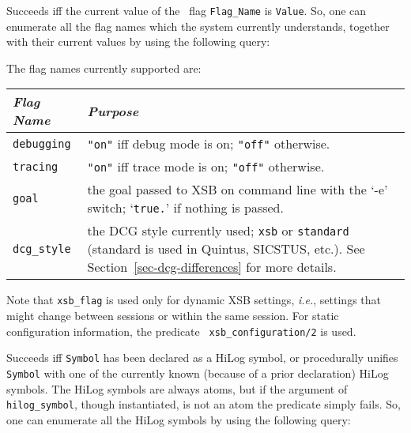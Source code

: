 \begin{description}
    Succeeds iff the current value of the \ourprolog\ flag {\tt Flag\_Name} is 
    {\tt Value}. So, one can enumerate all the flag names which the system
    currently understands, together with their current values by using the
    following query:


    The flag names currently supported are:

    \begin{center}
    \begin{tabular}{||l|p{11cm}||}               \hline
	{\em Flag Name}		& {\em Purpose} \\ \hline \hline
	{\tt debugging}		& 
		{\tt "on"} iff debug mode is on; {\tt "off"} otherwise.\\ \hline
	{\tt tracing}		& 
		{\tt "on"} iff trace mode is on; {\tt "off"} otherwise.\\ \hline
	{\tt goal}		& 
		the goal passed to XSB on command line with the `-e'
                switch; `{\tt true.}' if nothing is passed.
                \\ \hline
        {\tt dcg\_style}        &
                the DCG style currently used; {\tt xsb} or {\tt standard}
                (standard is used in Quintus, SICSTUS, etc.).
                See Section~\ref{sec-dcg-differences} for more details.
                \\ \hline
    \end{tabular}
    \end{center}
    
    Note that {\tt xsb\_flag} is used only for dynamic XSB settings, {\it
      i.e.}, settings that might change between sessions or within the same
    session. For static configuration information, the predicate {\tt
      xsb\_configuration/2} is used.  

    Succeeds iff {\tt Symbol} has been declared as a HiLog symbol, or 
    procedurally unifies {\tt Symbol} with one of the currently known 
    (because of a prior declaration) HiLog symbols. The HiLog symbols
    are always atoms, but if the argument of {\tt hilog\_symbol},
    though instantiated, is not an atom the predicate simply fails.
    So, one can enumerate all the HiLog symbols by using the following
    query:



\end{description}
